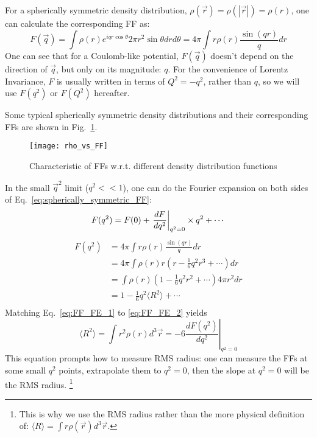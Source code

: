 For a spherically symmetric density distribution, 
$\rho(\vec{r}) = \rho({|\vec{r}|}) = \rho(r)$, 
one can calculate the corresponding FF as:
\begin{equation}
    F(\vec{q}) = \int \rho(r) e^{iqr\cos\theta} 2\pi r^2 \sin\theta dr d\theta
	= 4\pi \int r \rho(r) \frac{\sin{(qr)}}{q} dr
    \label{eq:spherically_symmetric_FF}
\end{equation}
One can see that for a Coulomb-like potential, $F(\vec{q})$ doesn't depend on
the direction of $\vec{q}$, but only on its magnitude: $q$. For the convenience 
of Lorentz Invariance, $F$ is usually written in terms of $Q^2 = -q^2$, rather
than $q$, so we will use $F(q^2)$ or $F(Q^2)$ hereafter.

Some typical spherically symmetric density distributions and their 
corresponding FFs are shown in Fig.~\ref{fig:FFs}.
\begin{figure}[H]
    \texttt{[image: rho\_vs\_FF]}
    \caption{Characteristic of FFs w.r.t. different density distribution functions}
    \label{fig:FFs}
\end{figure}

In the small $\vec{q}^2$ limit ($q^2 << 1$), one can do the Fourier expansion on both
sides of Eq.~\ref{eq:spherically_symmetric_FF}:
\begin{equation}
    F(q^2) = F(0) + \left.\frac{dF}{dq^2}\right|_{q^2=0} \times q^2 + \cdots	\\
    \label{eq:FF_FE_1}
\end{equation}
\begin{equation}
    \begin{aligned}
	F(q^2) &= 4\pi \int r \rho(r) \frac{\sin{(qr)}}{q} dr \\
	    &= 4\pi \int \rho(r) r \left( r - \frac{1}{6} q^2r^3 + \cdots \right) dr	\\
	    &= \int \rho(r)  \left( 1 - \frac{1}{6} q^2r^2 + \cdots \right) 4\pi r^2 dr	\\
	    &= 1 - \frac{1}{6}q^2\langle R^2 \rangle + \cdots \\
    \end{aligned}
    \label{eq:FF_FE_2}
\end{equation}
Matching Eq.~\ref{eq:FF_FE_1} to \ref{eq:FF_FE_2} yields
\begin{equation}
    \langle R^2 \rangle = \int r^2 \rho(r) d^3\vec{r} = -6 \left. \frac{dF(q^2)}{dq^2} \right|_{q^2 = 0}
\end{equation}
This equation prompts how to measure RMS radius:
one can measure the FFs at some small $q^2$ points, extrapolate them 
to $q^2 = 0$, then the slope at $q^2 = 0$ will be the RMS radius.
\footnote{This is why we use the RMS radius rather than the more physical definition of: 
$\langle R \rangle = \int  r \rho(\vec{r}) d^3\vec{r}$.}

